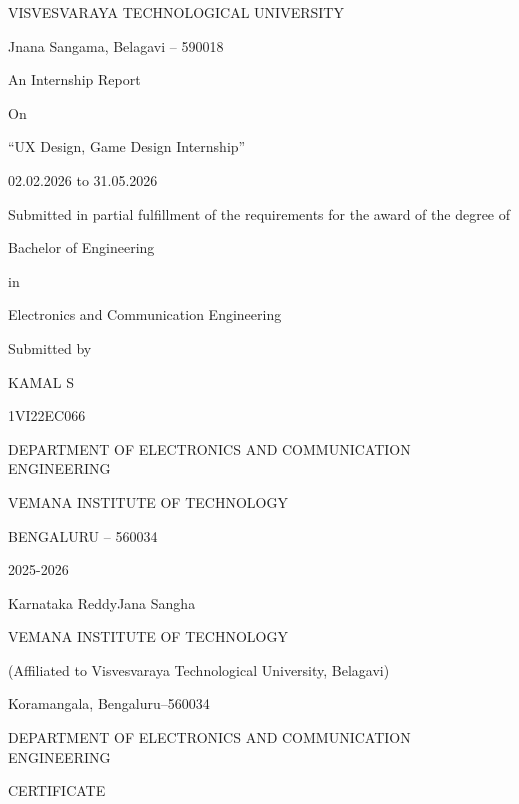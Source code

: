 \documentclass[12pt,a4paper]{report}
\begin{document}
\begin{titlepage}
\centering
{\Large VISVESVARAYA TECHNOLOGICAL UNIVERSITY\par}
\vspace{0.3cm}
{\large Jnana Sangama, Belagavi -- 590018\par}
\vspace{1.2cm}
{\Large An Internship Report\par}
\vspace{0.4cm}
{\large On\par}
\vspace{0.4cm}
{\Large \textquotedblleft UX Design, Game Design Internship\textquotedblright\par}
\vspace{0.4cm}
{\large 02.02.2026 to 31.05.2026\par}
\vspace{1cm}
Submitted in partial fulfillment of the requirements for the award of the degree of\par
\vspace{0.3cm}
{\Large Bachelor of Engineering\par}
\vspace{0.2cm}
in\par
\vspace{0.2cm}
{\Large Electronics and Communication Engineering\par}
\vspace{1cm}
Submitted by\par
\vspace{0.3cm}
{\Large KAMAL S\par}
{\Large 1VI22EC066\par}
\vfill
{\Large DEPARTMENT OF ELECTRONICS AND COMMUNICATION ENGINEERING\par}
{\Large VEMANA INSTITUTE OF TECHNOLOGY\par}
{\Large BENGALURU -- 560034\par}
\vspace{0.4cm}
{\Large 2025-2026\par}
\end{titlepage}

\setcounter{page}{1}
\begin{center}
{\Large Karnataka ReddyJana Sangha\par}
{\Large VEMANA INSTITUTE OF TECHNOLOGY\par}
(Affiliated to Visvesvaraya Technological University, Belagavi)\par
Koramangala, Bengaluru--560034\par
\vspace{0.5cm}
{\Large DEPARTMENT OF ELECTRONICS AND COMMUNICATION ENGINEERING\par}
\vspace{1cm}
{\Large CERTIFICATE\par}
\end{center}
\end{document}
